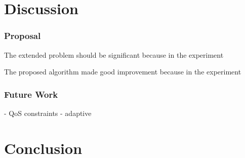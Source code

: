 \documentclass[senior,final,11pt]{iscs-thesis}
\begin{document}
\chapter{Discussion}

\subsection{Proposal}
The extended problem should be significant because in the experiment

The proposed algorithm made good improvement because in the experiment 


\subsection{Future Work}
- QoS constraints
- adaptive


\chapter{Conclusion}

 
 
\end{document}
